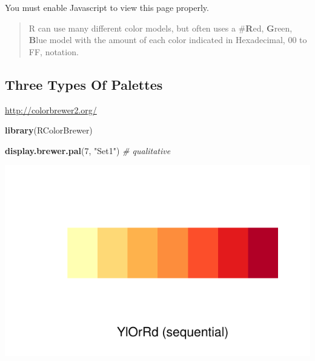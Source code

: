 \documentclass[]{tufte-handout}
\newenvironment{Shaded}{\begin{snugshade}}{\end{snugshade}}
\newcommand{\CommentTok}[1]{\textcolor[rgb]{0.56,0.35,0.01}{\textit{#1}}}
\newcommand{\DecValTok}[1]{\textcolor[rgb]{0.00,0.00,0.81}{#1}}
\newcommand{\KeywordTok}[1]{\textcolor[rgb]{0.13,0.29,0.53}{\textbf{#1}}}
\newcommand{\NormalTok}[1]{#1}
\newcommand{\StringTok}[1]{\textcolor[rgb]{0.31,0.60,0.02}{#1}}
\begin{document}
\hypertarget{unnamed_chunk_1div}{}

You must enable Javascript to view this page properly.

\begin{quote}
R can use many different color models, but often uses a \#\textbf{R}ed,
\textbf{G}reen, \textbf{B}lue model with the amount of each color
indicated in Hexadecimal, 00 to FF, notation.
\end{quote}

\hypertarget{three-types-of-palettes}{%
\subsection{Three Types Of Palettes}\label{three-types-of-palettes}}

\url{http://colorbrewer2.org/}

\begin{Shaded}
\begin{Highlighting}[]
\KeywordTok{library}\NormalTok{(RColorBrewer)}
\end{Highlighting}
\end{Shaded}

\begin{Shaded}
\begin{Highlighting}[]
\KeywordTok{display.brewer.pal}\NormalTok{(}\DecValTok{7}\NormalTok{, }\StringTok{"Set1"}\NormalTok{)  }\CommentTok{# qualitative}
\end{Highlighting}
\end{Shaded}

\begin{marginfigure}
\includegraphics{design_files/figure-latex/unnamed-chunk-3-1} \end{marginfigure}
\end{document}
